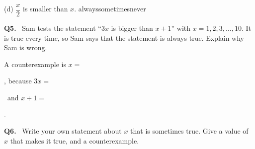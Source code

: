 \documentclass[14pt,a4paper]{extarticle}
\newcommand{\qn}[1]{\textbf{Q#1.}\ }
\newcommand{\gapstrut}{\rule[-1.5mm]{0pt}{7.5mm}}
\newcommand{\gap}{\gapstrut\underline{\hspace{1.4cm}}}
\newcommand{\writeline}{\par\gapstrut\underline{\hspace{\linewidth}}\par}
\newcommand{\circleone}{\hfill always\qquad sometimes\qquad never\par}
\begin{document}
\vspace{6pt}
(d) $\dfrac{x}{2}$ is smaller than $x$. \circleone
\writeline

\vfill
\qn{5} Sam tests the statement ``$3x$ is bigger than $x+1$'' with
$x=1, 2, 3, \dots, 10$. It is true every time, so Sam says that the
statement is always true. Explain why Sam is wrong.
\writeline
A counterexample is $x=$ \gap, because $3x=$ \gap\ and $x+1=$ \gap.

\vfill
\qn{6} Write your own statement about $x$ that is sometimes true. Give a
value of $x$ that makes it true, and a counterexample.
\writeline
\writeline
\vfill
\end{document}

